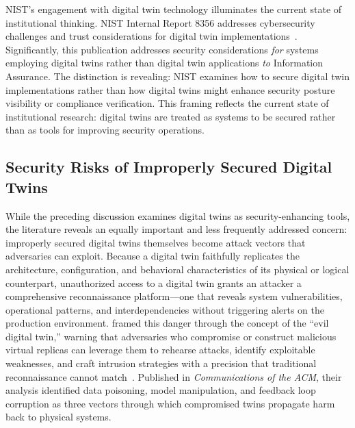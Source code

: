 NIST's engagement with digital twin technology illuminates the current state of institutional thinking. NIST Internal Report 8356 addresses cybersecurity challenges and trust considerations for digital twin implementations~\parencite{NIST_IR_8356_2025}. Significantly, this publication addresses security considerations \textit{for} systems employing digital twins rather than digital twin applications \textit{to} Information Assurance. The distinction is revealing: NIST examines how to secure digital twin implementations rather than how digital twins might enhance security posture visibility or compliance verification. This framing reflects the current state of institutional research: digital twins are treated as systems to be secured rather than as tools for improving security operations.

\subsection{Security Risks of Improperly Secured Digital Twins}

While the preceding discussion examines digital twins as security-enhancing tools, the literature reveals an equally important and less frequently addressed concern: improperly secured digital twins themselves become attack vectors that adversaries can exploit. Because a digital twin faithfully replicates the architecture, configuration, and behavioral characteristics of its physical or logical counterpart, unauthorized access to a digital twin grants an attacker a comprehensive reconnaissance platform---one that reveals system vulnerabilities, operational patterns, and interdependencies without triggering alerts on the production environment. \citeauthor{Suhail_Iqbal_Jurdak_2024} framed this danger through the concept of the ``evil digital twin,'' warning that adversaries who compromise or construct malicious virtual replicas can leverage them to rehearse attacks, identify exploitable weaknesses, and craft intrusion strategies with a precision that traditional reconnaissance cannot match~\parencite{Suhail_Iqbal_Jurdak_2024}. Published in \textit{Communications of the ACM}, their analysis identified data poisoning, model manipulation, and feedback loop corruption as three vectors through which compromised twins propagate harm back to physical systems.

